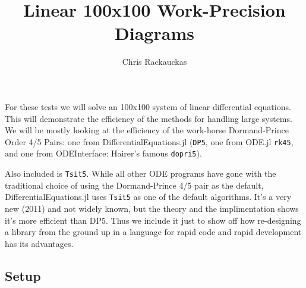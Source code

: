 \documentclass[12pt,a4paper]{article}
\title{ Linear 100x100 Work-Precision Diagrams }
\author{ Chris Rackauckas }
\begin{document}
\maketitle

For these tests we will solve an 100x100 system of linear differential equations. This will demonstrate the efficiency of the methods for handling large systems. We will be mostly looking at the efficiency of the work-horse Dormand-Prince Order 4/5 Pairs: one from DifferentialEquations.jl (\texttt{DP5}, one from ODE.jl \texttt{rk45}, and one from ODEInterface: Hairer's famous \texttt{dopri5}).

Also included is \texttt{Tsit5}. While all other ODE programs have gone with the traditional choice of using the Dormand-Prince 4/5 pair as the default, DifferentialEquations.jl uses \texttt{Tsit5} as one of the default algorithms. It's a very new (2011) and not widely known, but the theory and the implimentation shows it's more efficient than DP5. Thus we include it just to show off how re-designing a library from the ground up in a language for rapid code and rapid development has its advantages.

\subsection{Setup}
\end{document}
